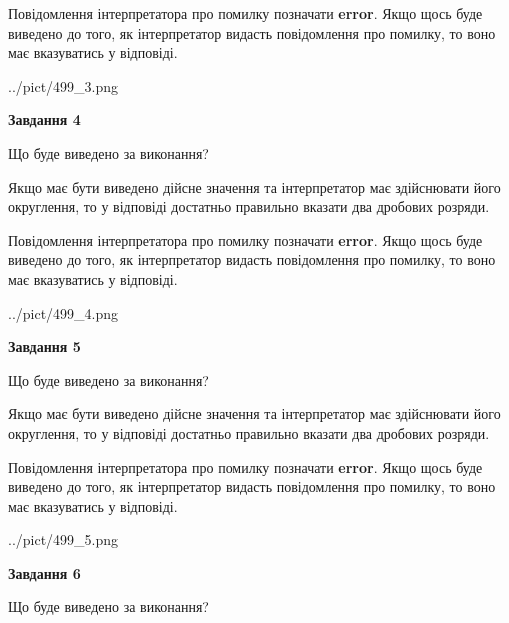 \documentclass[12pt, ukrainian]{article}
\begin{document}
{\begin {Large}
Повідомлення інтерпретатора про помилку позначати \textbf{error}.
Якщо щось буде виведено до того, як інтерпретатор видасть повідомлення про помилку, 
то воно має вказуватись у відповіді. \par

\begin{center}
	{../pict/499_3.png}
\end{center}
\newpage

{\begin {center}\textbf{Завдання 4}\end {center}}\par
Що буде виведено за виконання? \par

Якщо має бути виведено дійсне значення та інтерпретатор має здійснювати його округлення, 
то у відповіді достатньо правильно вказати два дробових розряди.

Повідомлення інтерпретатора про помилку позначати \textbf{error}.
Якщо щось буде виведено до того, як інтерпретатор видасть повідомлення про помилку, 
то воно має вказуватись у відповіді. \par

\begin{center}
	{../pict/499_4.png}
\end{center}
\newpage

{\begin {center}\textbf{Завдання 5}\end {center}}\par
Що буде виведено за виконання? \par

Якщо має бути виведено дійсне значення та інтерпретатор має здійснювати його округлення, 
то у відповіді достатньо правильно вказати два дробових розряди.

Повідомлення інтерпретатора про помилку позначати \textbf{error}.
Якщо щось буде виведено до того, як інтерпретатор видасть повідомлення про помилку, 
то воно має вказуватись у відповіді. \par

\begin{center}
	{../pict/499_5.png}
\end{center}
\newpage

{\begin {center}\textbf{Завдання 6}\end {center}}\par
Що буде виведено за виконання? \par


\end{Large}}
\end{document}
